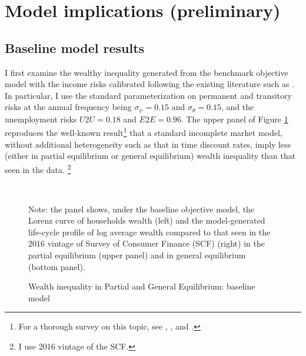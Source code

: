 \hypertarget{experiments}{%
\section{Model implications (preliminary)}\label{experiments}}

\subsection{Baseline model results}

I first examine the wealthy inequality generated from the benchmark objective model with the income risks calibrated following the existing literature such as \cite{krueger2016macroeconomics,carroll2017distribution}. In particular, I use the standard parameterization on permanent and transitory risks at the annual frequency being $\sigma_\psi=0.15$ and $\sigma_\theta =0.15$, and the unemployment risks $U2U=0.18$ and $E2E=0.96$. The upper panel of Figure \ref{fig:StE_dist_objective} reproduces the well-known result\footnote{For a thorough survey on this topic, see \cite{guvenen2011macroeconomics}, \cite{de2015quantitative}, and \cite{kaplan2018microeconomic}. } that a standard incomplete market model, without additional heterogeneity such as that in time discount rates, imply less (either in partial equilibrium or general equilibrium) wealth inequality than that seen in the data. \footnote{I use 2016 vintage of the SCF. }


\begin{figure}[!ht]
	\caption{Wealth inequality in Partial and General Equilibrium: baseline model}
	\label{fig:StE_dist_objective}
	\begin{center}
			  \\
\end{center}
\begin{flushleft}Note: the panel shows, under the baseline objective model, the Lorenz curve of households wealth (left) and the model-generated life-cycle profile of log average wealth compared to that seen in the 2016 vintage of Survey of Consumer Finance (SCF) (right) in the partial equilibrium (upper panel) and in general equilibrium (bottom panel). \end{flushleft}
\end{figure}


